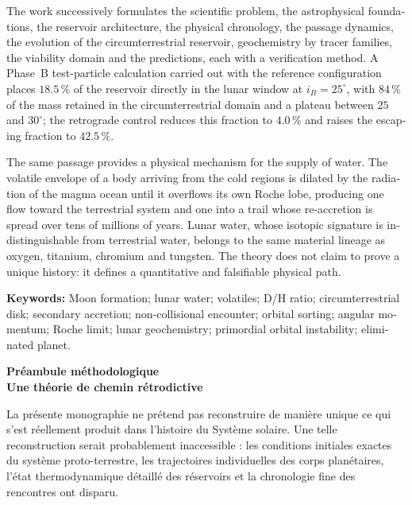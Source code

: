 \documentclass[11pt,a4paper,openany]{report}
\begin{document}
\begin{otherlanguage}{english}
The work successively formulates the scientific problem, the astrophysical foundations, the
reservoir architecture, the physical chronology, the passage dynamics, the evolution of the
circumterrestrial reservoir, geochemistry by tracer families, the viability domain and the
predictions, each with a verification method. A Phase~B test-particle calculation carried out with
the reference configuration places $18.5\,\%$ of the reservoir directly in the lunar window at
$i_B=25^\circ$, with $84\,\%$ of the mass retained in the circumterrestrial domain and a plateau
between $25$ and $30^\circ$; the retrograde control reduces this fraction to $4.0\,\%$ and raises
the escaping fraction to $42.5\,\%$.

The same passage provides a physical mechanism for the supply of water. The volatile envelope of a
body arriving from the cold regions is dilated by the radiation of the magma ocean until it
overflows its own Roche lobe, producing one flow toward the terrestrial system and one into a
trail whose re-accretion is spread over tens of millions of years. Lunar water, whose isotopic
signature is indistinguishable from terrestrial water, belongs to the same material lineage as
oxygen, titanium, chromium and tungsten. The theory does not claim to prove a unique history: it
defines a quantitative and falsifiable physical path.

\bigskip
\noindent\textbf{Keywords:} Moon formation; lunar water; volatiles; D/H ratio; circumterrestrial
disk; secondary accretion; non-collisional encounter; orbital sorting; angular momentum; Roche
limit; lunar geochemistry; primordial orbital instability; eliminated planet.
\end{otherlanguage}

\clearpage
\thispagestyle{plain}
{}
\begin{center}
{\Large\bfseries Préambule méthodologique}\\[4pt]
{\large\bfseries Une théorie de chemin rétrodictive}
\end{center}
\medskip

La présente monographie ne prétend pas reconstruire de manière unique ce qui
s'est réellement produit dans l'histoire du Système solaire. Une telle
reconstruction serait probablement inaccessible : les conditions initiales
exactes du système proto-terrestre, les trajectoires individuelles des corps
planétaires, l'état thermodynamique détaillé des réservoirs et la chronologie
fine des rencontres ont disparu.
\end{document}
